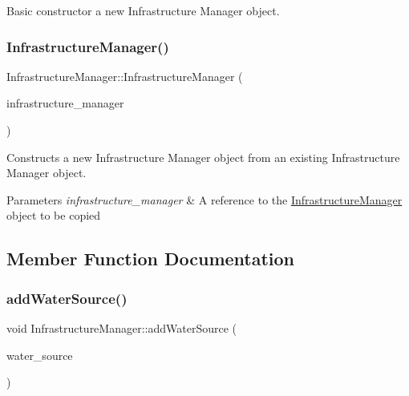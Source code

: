 Basic constructor a new Infrastructure Manager object. 

\mbox{\label{classInfrastructureManager_a9d1fe6a0325a3705dbfabb92afbe9055}} 
\subsubsection{\texorpdfstring{Infrastructure\+Manager()}{InfrastructureManager()}\hspace{0.1cm}{\footnotesize\ttfamily [3/3]}}
{\footnotesize\ttfamily Infrastructure\+Manager\+::\+Infrastructure\+Manager (\begin{DoxyParamCaption}\item[{\mbox{\hyperlink{classInfrastructureManager}{Infrastructure\+Manager}} \&}]{infrastructure\+\_\+manager }\end{DoxyParamCaption})}



Constructs a new Infrastructure Manager object from an existing Infrastructure Manager object. 


\begin{DoxyParams}{Parameters}
{\em infrastructure\+\_\+manager} & A reference to the \mbox{\hyperlink{classInfrastructureManager}{Infrastructure\+Manager}} object to be copied \\
\hline
\end{DoxyParams}


\subsection{Member Function Documentation}
\mbox{\label{classInfrastructureManager_a3950df03bc8fd5743aefeca4c3d7bf98}} 
\subsubsection{\texorpdfstring{add\+Water\+Source()}{addWaterSource()}}
{\footnotesize\ttfamily void Infrastructure\+Manager\+::add\+Water\+Source (\begin{DoxyParamCaption}\item[{\mbox{\hyperlink{classWaterSource}{Water\+Source}} $\ast$}]{water\+\_\+source }\end{DoxyParamCaption})}



